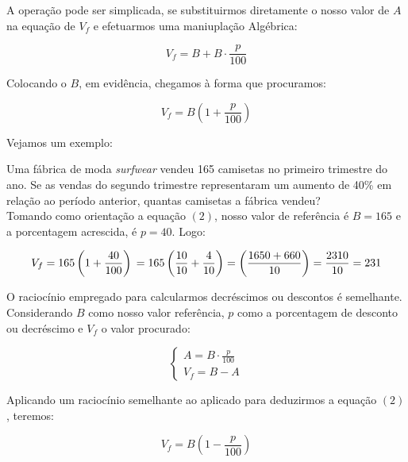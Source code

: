 \documentclass[12pt, a4paper, brazil]{abntex2}
\begin{document}
    A operação pode ser simplicada, se substituirmos diretamente o nosso valor de $A$ na equação de $V_f$ e efetuarmos uma maniuplação Algébrica:

        \begin{equation*}
            V_f = B + B \cdot \displaystyle\frac{p}{100}
        \end{equation*}

    Colocando o $B$, em evidência, chegamos à forma que procuramos:

        \begin{equation}
            V_f = B\left(1 + \displaystyle \frac{p}{100}\right)
        \end{equation}

    Vejamos um exemplo:

        \begin{exemplo}
            Uma fábrica de moda \textit{surfwear} vendeu 165 camisetas no primeiro trimestre do ano. Se as vendas do segundo trimestre representaram um aumento de 40\% em relação ao período anterior, quantas camisetas a fábrica vendeu?\\
            Tomando como orientação a equação $(2)$, nosso valor de referência é $B=165$ e a porcentagem acrescida, é $p=40$. Logo:

                \[
                    V_f = 165 \left(1 + \frac{40}{100}\right)\\
                    = 165 \left(\frac{10}{10} + \frac{4}{10}\right) = \left(\frac{1650 + 660}{10}\right) = \frac{2310}{10} = 231
                \]   
        \end{exemplo}
        \vspace{18pt}
        O raciocínio empregado para calcularmos decréscimos ou descontos é semelhante. Considerando $B$ como nosso valor referência, $p$ como a porcentagem de desconto ou decréscimo e $V_f$ o valor procurado:

        \begin{equation}
           \begin{cases}
            A = B \cdot \displaystyle\frac{p}{100}\\
            V_f = B - A
           \end{cases} 
        \end{equation}

        Aplicando um raciocínio semelhante ao aplicado para deduzirmos a equação $(2)$, teremos:

        \begin{equation}
            V_f = B\left(1 - \frac{p}{100} \right)
        \end{equation}
        
\end{document}

